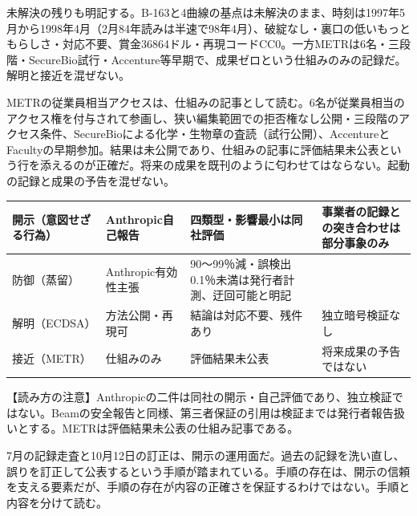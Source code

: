 \documentclass[lualatex,a4paper,10pt]{jlreq}
\begin{document}
未解決の残りも明記する。B-163と4曲線の基点は未解決のまま、時刻は1997年5月から1998年4月（2月84年読みは半速で98年4月）、破綻なし・裏口の低いもっともらしさ・対応不要、賞金36864ドル・再現コードCC0。一方METRは6名・三段階・SecureBio試行・Accenture等早期で、成果ゼロという仕組みのみの記録だ。解明と接近を混ぜない。
\cite{B42,B81,B39,B82}


METRの従業員相当アクセスは、仕組みの記事として読む。6名が従業員相当のアクセス権を付与されて参画し、狭い編集範囲での拒否権なし公開・三段階のアクセス条件、SecureBioによる化学・生物章の査読（試行公開）、AccentureとFacultyの早期参加。結果は未公開であり、仕組みの記事に評価結果未公表という行を添えるのが正確だ。将来の成果を既刊のように匂わせてはならない。起動の記録と成果の予告を混ぜない。
\cite{B39,B82}


\begin{strip} %
\centering\footnotesize
{}
\begin{tabularx}{0.96\linewidth}{@{}lXXX@{}}
\toprule
開示（意図せざる行為） & Anthropic自己報告 & 四類型・影響最小は同社評価 & 事業者の記録との突き合わせは部分事象のみ \cite{B40,B79} \\
\midrule
防御（蒸留） & Anthropic有効性主張 & 90〜99％減・誤検出0.1％未満は発行者計測、迂回可能と明記 \cite{B41,B80} \\
\midrule
解明（ECDSA） & 方法公開・再現可 & 結論は対応不要、残件あり & 独立暗号検証なし \cite{B42,B81} \\
\midrule
接近（METR） & 仕組みのみ & 評価結果未公表 & 将来成果の予告ではない \cite{B39,B82} \\
\bottomrule
\end{tabularx}
\end{strip} %

\begin{tcolorbox}[colback=SurveySoft,colframe=SurveyRule,arc=1mm,boxrule=0.4pt,left=2mm,right=2mm]
【読み方の注意】Anthropicの二件は同社の開示・自己評価であり、独立検証ではない。Beamの安全報告と同様、第三者保証の引用は検証までは発行者報告扱いとする。METRは評価結果未公表の仕組み記事である。
\end{tcolorbox}
\cite{B40,B79,B41,B80,B42,B81,B39,B82}

7月の記録走査と10月12日の訂正は、開示の運用面だ。過去の記録を洗い直し、誤りを訂正して公表するという手順が踏まれている。手順の存在は、開示の信頼を支える要素だが、手順の存在が内容の正確さを保証するわけではない。手順と内容を分けて読む。
\cite{B40,B79}
\end{document}
